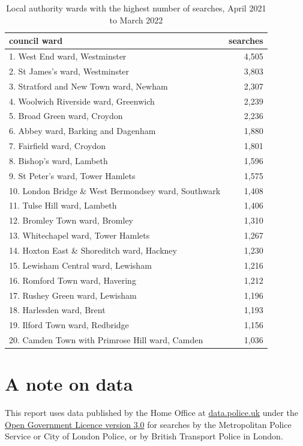 \documentclass[
  a4paper,
  twoside, 11pt]{article}
\begin{document}
\begin{table}

\caption{\label{tab:table-ward}Local authority wards with the highest number of searches, April 2021 to March 2022}
\centering
\begin{tabular}[t]{lr}
\toprule
council ward & searches\\
\midrule
1. West End ward, Westminster & 4,505\\
2. St James's ward, Westminster & 3,803\\
3. Stratford and New Town ward, Newham & 2,307\\
4. Woolwich Riverside ward, Greenwich & 2,239\\
5. Broad Green ward, Croydon & 2,236\\
6. Abbey ward, Barking and Dagenham & 1,880\\
7. Fairfield ward, Croydon & 1,801\\
8. Bishop's ward, Lambeth & 1,596\\
9. St Peter's ward, Tower Hamlets & 1,575\\
10. London Bridge \& West Bermondsey ward, Southwark & 1,408\\
11. Tulse Hill ward, Lambeth & 1,406\\
12. Bromley Town ward, Bromley & 1,310\\
13. Whitechapel ward, Tower Hamlets & 1,267\\
14. Hoxton East \& Shoreditch ward, Hackney & 1,230\\
15. Lewisham Central ward, Lewisham & 1,216\\
16. Romford Town ward, Havering & 1,212\\
17. Rushey Green ward, Lewisham & 1,196\\
18. Harlesden ward, Brent & 1,193\\
19. Ilford Town ward, Redbridge & 1,156\\
20. Camden Town with Primrose Hill ward, Camden & 1,036\\
\bottomrule
\end{tabular}
\end{table}

\hypertarget{a-note-on-data}{%
\section{A note on data}\label{a-note-on-data}}

This report uses data published by the Home Office at \href{https://data.police.uk/}{data.police.uk} under the \href{https://www.nationalarchives.gov.uk/doc/open-government-licence/version/3/}{Open Government Licence version 3.0} for searches by the Metropolitan Police Service or City of London Police, or by British Transport Police in London.
\end{document}

